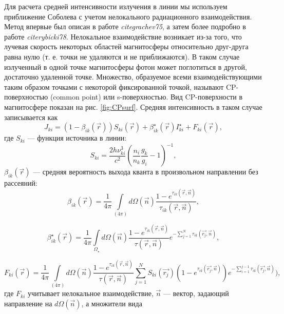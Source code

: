 \documentclass{article}
\begin{document}
Для расчета средней интенсивности излучения в линии мы используем приближение Соболева с учетом нелокального радиационного взаимодействия. Метод впервые был описан в работе \textit{cite{grachev75}}, а затем более подробно в работе \textit{cite{rybicki78}}. Нелокальное взаимодействие возникает из-за того, что лучевая скорость некоторых областей магнитосферы относительно друг-друга равна нулю (т. е. точки не удаляются и не приближаются). В таком случае излученный в одной точке магнитосферы фотон может поглотиться в другой, достаточно удаленной точке. Множество, образуемое всеми взаимодействующими таким образом точками с некоторой фиксированной точкой, называют CP-поверхностью (common point) или s-поверхностью. Вид CP-поверхности в магнитосфере показан на рис. \ref{fig:CPsurf}. Средняя интенсивность в таком случае записывается как
\FloatBarrier
\begin{equation} \label{eq:meanint}
J_{ki} = (1-\beta_{ik}(\vec{r}))S_{ki}(\vec{r}) + \beta_{ik}^\star(\vec{r})I^\star_{ki} + F_{ki}(\vec{r}),
\end{equation}
где $S_{ki}$ --- функция источника в линии:
\begin{equation} \label{eq:source}
S_{ki} = \frac{2h\nu_{ki}^3}{c^2}\left( \frac{n_i}{n_k} \frac{g_k}{g_i} - 1 \right)^{-1},
\end{equation}
$\beta_{ik}(\vec{r})$ --- средняя вероятность выхода кванта в произвольном направлении без рассеяний:
\begin{equation} \label{eq:beta}
\beta_{ik}(\vec{r}) = \frac{1}{4\pi}\int\limits_{(4\pi)} d\Omega(\vec{n})\frac{1-e^{\tau_{ik}(\vec{r},\vec{n})}}{\tau_{ik}(\vec{r},\vec{n})}, 
\end{equation}

\begin{equation} \label{eq:starbeta}
\beta_{ik}^\star(\vec{r}) = \frac{1}{4\pi}\int\limits_{\Omega_\star} d\Omega(\vec{n})\frac{1-e^{\tau_{ik}(\vec{r},\vec{n})}}{\tau(\vec{r},\vec{n})}e^{-\sum_{j=1}^N\tau_{ik}(\vec{r_j},\vec{n})},
\end{equation}

\begin{equation} \label{eq:CPF}
F_{ki}(\vec{r}) = \frac{1}{4\pi}\int\limits_{(4\pi)} d\Omega(\vec{n})\frac{1-e^{\tau_{ik}(\vec{r},\vec{n})}}{\tau(\vec{r},\vec{n})}\sum\limits_{j=1}^N S_{ki}(\vec{r_j}) (1-e^{\tau_{ik}(\vec{r_j},\vec{n})}) e^{-\sum_{i=1}^{j-1}\tau_{ik}(\vec{r_j},\vec{n})}),
\end{equation}
где $F_{ki}$ учитывает нелокальное взаимодействие, $\vec{n}$ --- вектор, задающий направление на $d\Omega(\vec{n})$, а множители вида
 
\end{document}
